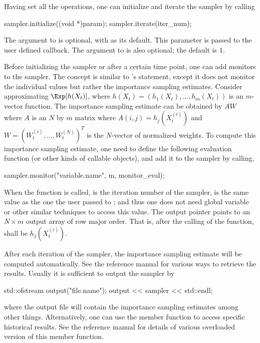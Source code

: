 Having set all the operations, one can initialize and iterate the sampler by
calling
\begin{cppcode}
sampler.initialize((void *)param);
sampler.iterate(iter_num);
\end{cppcode}
The  argument to  is optional, with
 as its default. This parameter is passed to the user defined
callback. The  argument to  is also
optional; the default is $1$.

Before initializing the sampler or after a certain time point, one can add
monitors to the sampler. The concept is similar to \bugs's 
statement, except it does not monitor the individual values but rather the
importance sampling estimates. Consider approximating $\Exp[h(X_t)]$, where
$h(X_t) = (h_1(X_t),\dots,h_m(X_t))$ is an $m$-vector function. The importance
sampling estimate can be obtained by $AW$ where $A$ is an $N$ by $m$ matrix
where $A(i,j) = h_j(X_t^{(i)})$ and $W = (W_t^{(i)},\dots,W_t^{(N)})^T$ is the
$N$-vector of normalized weights. To compute this importance sampling
estimate, one need to define the following evaluation function (or other kinds
of callable objects),
and add it to the sampler by calling,
\begin{cppcode}
sampler.monitor("variable.name", m, monitor_eval);
\end{cppcode}
When the function  is called,  is the
iteration number of the sampler,  is the same value as the one
the user passed to ; and thus one does not need
global variable or other similar techniques to access this value. The output
pointer  points to an $N \times m$ output array of row major
order. That is, after the calling of the function,
 shall be $h_j(X_t^{(i)})$.

After each iteration of the sampler, the importance sampling estimate will be
computed automatically. See the reference manual for various ways to retrieve
the results. Usually it is sufficient to output the sampler by
\begin{cppcode}
std::ofstream output("file.name");
output << sampler << std::endl;
\end{cppcode}
where the output file will contain the importance sampling estimates among
other things. Alternatively, one can use the 
member function to access specific historical results. See the reference
manual for details of various overloaded version of this member function.

